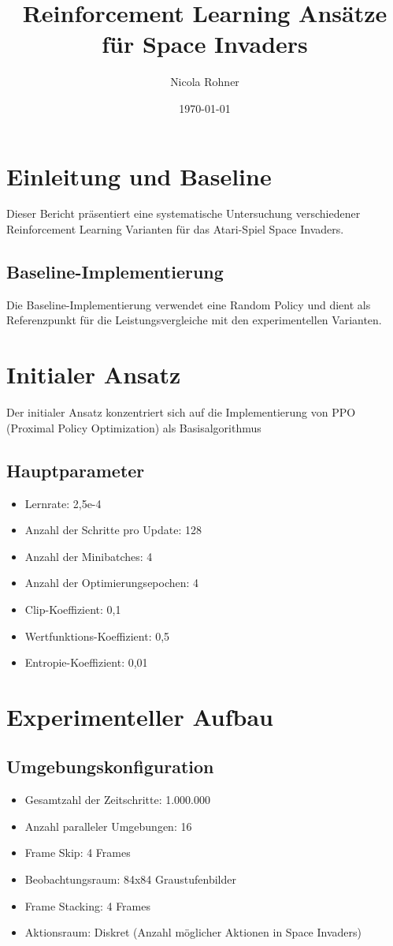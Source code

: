 \documentclass{article}
\title{Reinforcement Learning Ansätze für Space Invaders}
\author{Nicola Rohner}
\date{\today}
\begin{document}
\maketitle

\section{Einleitung und Baseline}
Dieser Bericht präsentiert eine systematische Untersuchung verschiedener Reinforcement Learning Varianten für das Atari-Spiel Space Invaders.

\subsection{Baseline-Implementierung}
Die Baseline-Implementierung verwendet eine Random Policy und dient als Referenzpunkt für die Leistungsvergleiche mit den experimentellen Varianten.


\section{Initialer Ansatz}
Der initialer Ansatz konzentriert sich auf die Implementierung von PPO (Proximal Policy Optimization) als Basisalgorithmus

\subsection{Hauptparameter}
\begin{itemize}
    \item Lernrate: 2,5e-4
    \item Anzahl der Schritte pro Update: 128
    \item Anzahl der Minibatches: 4
    \item Anzahl der Optimierungsepochen: 4
    \item Clip-Koeffizient: 0,1
    \item Wertfunktions-Koeffizient: 0,5
    \item Entropie-Koeffizient: 0,01
\end{itemize}

\section{Experimenteller Aufbau}
\subsection{Umgebungskonfiguration}
\begin{itemize}
    \item Gesamtzahl der Zeitschritte: 1.000.000
    \item Anzahl paralleler Umgebungen: 16
    \item Frame Skip: 4 Frames
    \item Beobachtungsraum: 84x84 Graustufenbilder
    \item Frame Stacking: 4 Frames
    \item Aktionsraum: Diskret (Anzahl möglicher Aktionen in Space Invaders)
\end{itemize}
\end{document}
